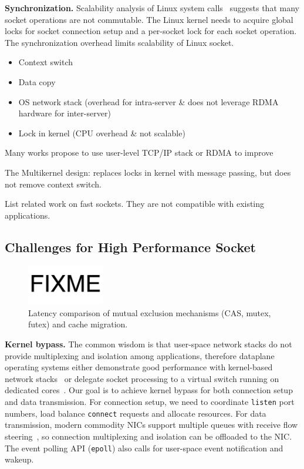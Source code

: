 \textbf{Synchronization.}
Scalability analysis of Linux system calls~\cite{boyd2010analysis} suggests that many socket operations are not commutable. The Linux kernel needs to acquire global locks for socket connection setup and a per-socket lock for each socket operation. The synchronization overhead limits scalability of Linux socket.

\begin{itemize}
	\item Context switch
	\item Data copy
	\item OS network stack (overhead for intra-server \& does not leverage RDMA hardware for inter-server)
	\item Lock in kernel (CPU overhead \& not scalable)
\end{itemize}

Many works propose to use user-level TCP/IP stack  or RDMA  to improve




The Multikernel design: replaces locks in kernel with message passing, but does not remove context switch.

List related work on fast sockets. They are not compatible with existing applications.

\subsection{Challenges for High Performance Socket}
\label{subsec:challenges}

\begin{figure}[t]
	\centering
	\includegraphics[width=0.3\textwidth]{images/fixme}
	\caption{Latency comparison of mutual exclusion mechanisms (CAS, mutex, futex) and cache migration.}
	\label{fig:mutual-exclusion}
\end{figure}

\textbf{Kernel bypass.}
The common wisdom is that user-space network stacks do not provide multiplexing and isolation among applications, therefore dataplane operating systems either demonstrate good performance with kernel-based network stacks~\cite{belay2014ix,tsai2017lite} or delegate socket processing to a virtual switch running on dedicated cores~\cite{martins2014clickos,roghanchi2017ffwd}.
Our goal is to achieve kernel bypass for both connection setup and data transmission.
For connection setup, we need to coordinate \texttt{listen} port numbers, load balance \texttt{connect} requests and allocate resources.
For data transmission, modern commodity NICs support multiple queues with receive flow steering~\cite{herbertrfs,libvma,openonload}, so connection multiplexing and isolation can be offloaded to the NIC.
The event polling API (\texttt{epoll}) also calls for user-space event notification and wakeup.


